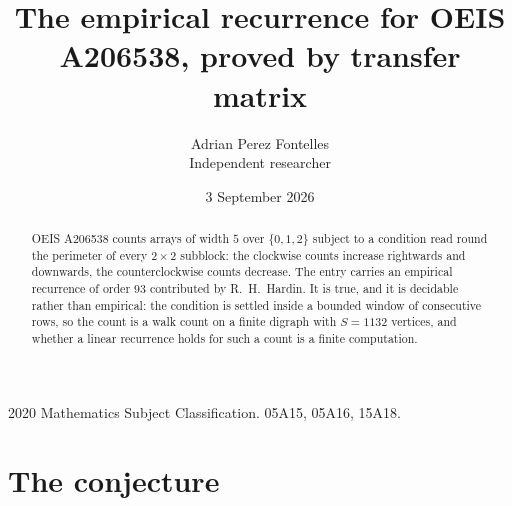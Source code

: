 \documentclass[11pt,a4paper]{article}
\title{The empirical recurrence for OEIS A206538, proved by transfer matrix}
\author{Adrian Perez Fontelles\\ \small Independent researcher}
\date{3 September 2026}
\theoremstyle{plain}
\theoremstyle{definition}
\begin{document}
\maketitle

\begin{abstract}
OEIS A206538 counts arrays of width $5$ over $\{0,1,2\}$ subject to a condition read round the
perimeter of every $2\times2$ subblock: the clockwise counts increase rightwards and downwards, the counterclockwise counts decrease. The entry carries an empirical recurrence of
order $93$ contributed by R.~H.~Hardin. It is true, and it is decidable rather than
empirical: the condition is settled inside a bounded window of consecutive rows, so the
count is a walk count on a finite digraph with $S=1132$ vertices, and whether a linear
recurrence holds for such a count is a finite computation.
\end{abstract}

\noindent\small 2020 Mathematics Subject Classification. 05A15, 05A16, 15A18.\normalsize

\section{The conjecture}
\end{document}
